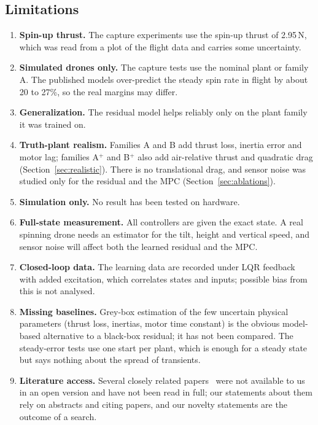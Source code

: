 \subsection{Limitations}
\begin{enumerate}
  \item \textbf{Spin-up thrust.} The capture experiments use the spin-up thrust of 2.95\,N, which was read from a plot of the flight data and carries some uncertainty.
  \item \textbf{Simulated drones only.} The capture tests use the nominal plant or family A. The published models over-predict the steady spin rate in flight by about 20 to 27\%, so the real margins may differ.
  \item \textbf{Generalization.} The residual model helps reliably only on the plant family it was trained on.
  \item \textbf{Truth-plant realism.} Families A and B add thrust loss, inertia error and motor lag; families A$^+$ and B$^+$ also add air-relative thrust and quadratic drag (Section~\ref{sec:realistic}). There is no translational drag, and sensor noise was studied only for the residual and the MPC (Section~\ref{sec:ablations}).
  \item \textbf{Simulation only.} No result has been tested on hardware.
  \item \textbf{Full-state measurement.} All controllers are given the exact state. A real spinning drone needs an estimator for the tilt, height and vertical speed, and sensor noise will affect both the learned residual and the MPC.
  \item \textbf{Closed-loop data.} The learning data are recorded under LQR feedback with added excitation, which correlates states and inputs; possible bias from this is not analysed.
  \item \textbf{Missing baselines.} Grey-box estimation of the few uncertain physical parameters (thrust loss, inertias, motor time constant) is the obvious model-based alternative to a black-box residual; it has not been compared. The steady-error tests use one start per plant, which is enough for a steady state but says nothing about the spread of transients.
  \item \textbf{Literature access.} Several closely related papers~\cite{stephan2018lpv,lanzon2014flight} were not available to us in an open version and have not been read in full; our statements about them rely on abstracts and citing papers, and our novelty statements are the outcome of a search.
\end{enumerate}

